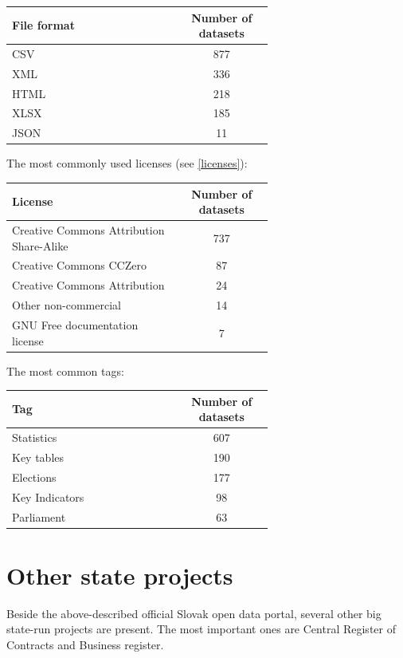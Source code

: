 \documentclass[thesis=B,english]{FITthesis}[2012/06/26]
\begin{document}
    \begin{center}
        \begin{tabular}{  p{0.65\linewidth} | c }
        \textbf{File format} & \textbf{Number of datasets} \\ \hline
        CSV & 877 \\
        XML & 336 \\
        HTML & 218 \\
        XLSX & 185 \\
        JSON & 11 \\
        \end{tabular}
    \end{center}
    \vspace{20px}
    The most commonly used licenses (see \ref{licenses}):
    \begin{center}
        \begin{tabular}{  p{0.65\linewidth} | c }
        \textbf{License} & \textbf{Number of datasets} \\ \hline
        Creative Commons Attribution Share-Alike & 737 \\
        Creative Commons CCZero & 87 \\
        Creative Commons Attribution & 24 \\
        Other non-commercial & 14 \\
        GNU Free documentation license & 7 \\
        \end{tabular}
    \end{center}
    \vspace{20px}
    The most common tags:
    \begin{center}
        \begin{tabular}{  p{0.65\linewidth} | c }
        \textbf{Tag} & \textbf{Number of datasets} \\ \hline
        Statistics & 607 \\
        Key tables & 190 \\
        Elections & 177 \\
        Key Indicators & 98 \\
        Parliament & 63 \\
        \end{tabular}
    \end{center}
    \section{Other state projects}
    Beside the above-described official Slovak open data portal, several other big state-run projects are present. The most important ones are Central Register of Contracts and Business register.
\end{document}
